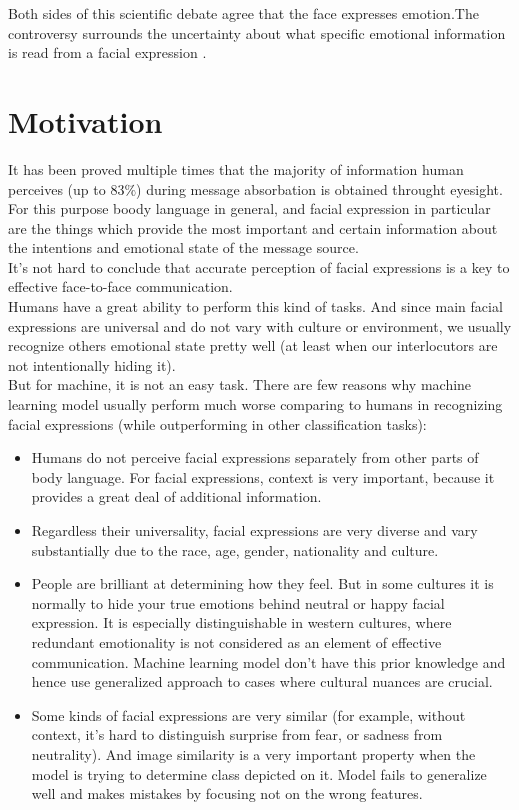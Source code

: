 Both sides of this scientific debate agree that the face expresses emotion.The controversy surrounds the uncertainty about what specific emotional information is read from a facial expression \cite{wiki}.


\section{Motivation}

It has been proved multiple times that the majority of information human perceives (up to $83\%$) during message absorbation is obtained throught eyesight. For this purpose boody language in general, and facial expression in particular are the things which provide the most important and certain information about the intentions and emotional state of the message source.\\

It's not hard to conclude that accurate perception of facial expressions is a key to effective face-to-face communication.\\

Humans have a great ability to perform this kind of tasks. And since main facial expressions are universal and do not vary with culture or environment, we usually recognize others emotional state pretty well (at least when our interlocutors are not intentionally hiding it).\\

But for machine, it is not an easy task. There are few reasons why machine learning model usually perform much worse comparing to humans in recognizing facial expressions (while outperforming in other classification tasks):
\begin{itemize}
	\item 
	Humans do not perceive facial expressions separately from other parts of body language. For facial expressions, context is very important, because it provides a great deal of additional information.
	\item
	Regardless their universality, facial expressions are very diverse and vary substantially due to the race, age, gender, nationality and culture.
	\item 
	People are brilliant at determining how they feel. But in some cultures it is normally to hide your true emotions behind neutral or happy facial expression. It is especially distinguishable in western cultures, where redundant emotionality is not considered as an element of effective communication. Machine learning model don't have this prior knowledge and hence use generalized approach to cases where cultural nuances are crucial.
	\item 
	Some kinds of facial expressions are very similar (for example, without context, it's hard to distinguish surprise from fear, or sadness from neutrality). And image similarity is a very important property when the model is trying to determine class depicted on it. Model fails to generalize well and makes mistakes by focusing not on the wrong features.
\end{itemize}

